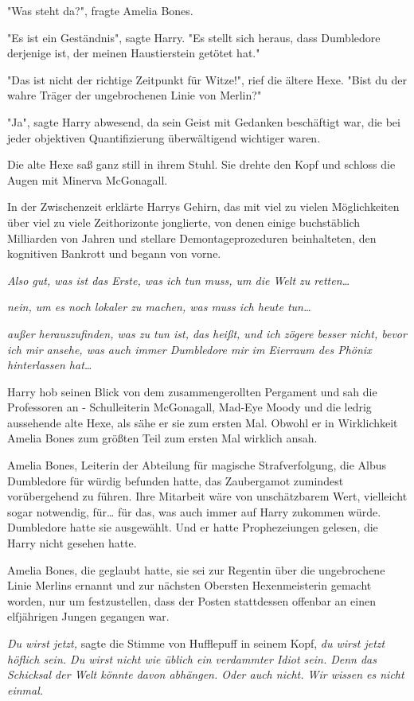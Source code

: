 {"Was steht da?", fragte Amelia Bones.

"Es ist ein Geständnis", sagte Harry. "Es stellt sich heraus, dass Dumbledore derjenige ist, der meinen Haustierstein getötet hat."

"Das ist nicht der richtige Zeitpunkt für Witze!", rief die ältere Hexe. "Bist du der wahre Träger der ungebrochenen Linie von Merlin?"

"Ja", sagte Harry abwesend, da sein Geist mit Gedanken beschäftigt war, die bei jeder objektiven Quantifizierung überwältigend wichtiger waren.

Die alte Hexe saß ganz still in ihrem Stuhl. Sie drehte den Kopf und schloss die Augen mit Minerva McGonagall.

In der Zwischenzeit erklärte Harrys Gehirn, das mit viel zu vielen Möglichkeiten über viel zu viele Zeithorizonte jonglierte, von denen einige buchstäblich Milliarden von Jahren und stellare Demontageprozeduren beinhalteten, den kognitiven Bankrott und begann von vorne.

\emph{Also gut, was ist das Erste, was ich tun muss, um die Welt zu retten…}

\emph{nein, um es noch lokaler zu machen, was muss ich heute tun…}

\emph{außer herauszufinden, was zu tun ist, das heißt, und ich zögere besser nicht, bevor ich mir ansehe, was auch immer Dumbledore mir im Eierraum des Phönix hinterlassen hat…}

Harry hob seinen Blick von dem zusammengerollten Pergament und sah die Professoren an - Schulleiterin McGonagall, Mad-Eye Moody und die ledrig aussehende alte Hexe, als sähe er sie zum ersten Mal. Obwohl er in Wirklichkeit Amelia Bones zum größten Teil zum ersten Mal wirklich ansah.

Amelia Bones, Leiterin der Abteilung für magische Strafverfolgung, die Albus Dumbledore für würdig befunden hatte, das Zaubergamot zumindest vorübergehend zu führen. Ihre Mitarbeit wäre von unschätzbarem Wert, vielleicht sogar notwendig, für… für das, was auch immer auf Harry zukommen würde. Dumbledore hatte sie ausgewählt. Und er hatte Prophezeiungen gelesen, die Harry nicht gesehen hatte.

Amelia Bones, die geglaubt hatte, sie sei zur Regentin über die ungebrochene Linie Merlins ernannt und zur nächsten Obersten Hexenmeisterin gemacht worden, nur um festzustellen, dass der Posten stattdessen offenbar an einen elfjährigen Jungen gegangen war.

\emph{Du wirst jetzt,} sagte die Stimme von Hufflepuff in seinem Kopf, \emph{du wirst jetzt höflich sein. Du wirst nicht wie üblich ein verdammter Idiot sein. Denn das Schicksal der Welt könnte davon abhängen. Oder auch nicht. Wir wissen es nicht einmal.}

}
